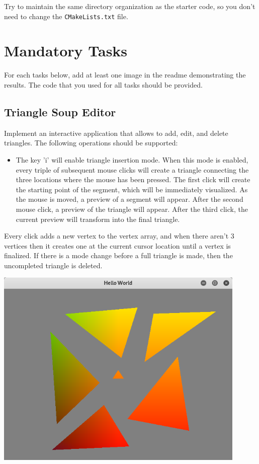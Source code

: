 \documentclass[11pt]{article}
\begin{document}
Try to maintain the same directory organization as the starter code, so you don't need to change the \texttt{CMakeLists.txt} file.


\section{Mandatory Tasks}
For each tasks below, add at least one image in the readme demonstrating the results. The code that you used for all tasks should be provided.

\subsection{Triangle Soup Editor}

Implement an interactive application that allows to add, edit, and delete triangles. The following operations should be supported:
\begin{itemize}
	\item The key 'i' will enable triangle insertion mode. When this mode is enabled, every triple of subsequent mouse clicks will create a triangle connecting the three locations where the mouse has been pressed. The first click will create the starting point of the segment, which will be immediately visualized. As the mouse is moved, a preview of a segment will appear. After the second mouse click, a preview of the triangle will appear. After the third click, the current preview will transform into the final triangle. 
\end{itemize}
Every click adds a new vertex to the vertex array, and when there aren't 3 vertices then it creates one at the current cursor location until a vertex is finalized. If there is a mode change before a full triangle is made, then the uncompleted triangle is deleted.

\includegraphics[width=0.9\textwidth]{trianglesoup.png}
\end{document}
